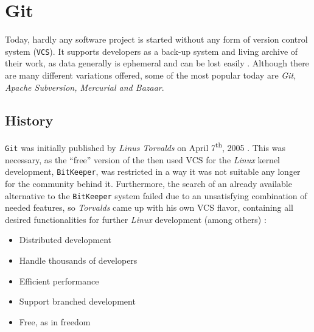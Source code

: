 \section{Git}
\label{sec:git}

Today, hardly any software project is started without any form of version control system (\texttt{VCS}). It supports developers as a back-up system and living archive of their work, as data generally is ephemeral and can be lost easily \cite[1]{loeliger2012version}. Although there are many different variations offered, some of the most popular today are \emph{Git, Apache Subversion, Mercurial and Bazaar}.

\subsection{History}
\label{sec:git-history}
\texttt{Git} was initially published by \emph{Linus Torvalds} on April 7\textsuperscript{th}, 2005 \cite[6]{loeliger2012version}. This was necessary, as the ``free'' version of the then used VCS for the \emph{Linux} kernel development, \texttt{BitKeeper}, was restricted in a way it was not suitable any longer for the community behind it. Furthermore, the search of an already available alternative to the \texttt{BitKeeper} system failed due to an unsatisfying combination of needed features, so \emph{Torvalds} came up with his own VCS flavor, containing all desired functionalities for further \emph{Linux} development (among others) \cite[4]{loeliger2012version}:

\begin{itemize}
  \item Distributed development
  \item Handle thousands of developers
  \item Efficient performance
  \item Support branched development
  \item Free, as in freedom
\end{itemize}

